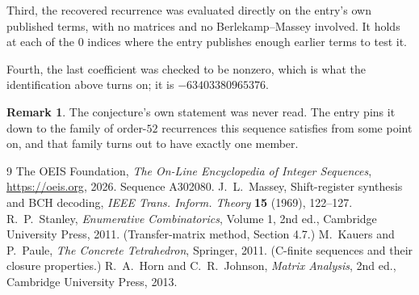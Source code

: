 \documentclass[11pt,a4paper]{article}
\theoremstyle{plain}
\theoremstyle{definition}
\newtheorem{remark}[theorem]{Remark}
\begin{document}
Third, the recovered recurrence was evaluated directly on the entry's own published terms, with
no matrices and no Berlekamp--Massey involved. It holds at each of the $0$ indices where
the entry publishes enough earlier terms to test it.

Fourth, the last coefficient was checked to be nonzero, which is what the identification above
turns on; it is $-63403380965376$.

\begin{remark}
The conjecture's own statement was never read. The entry pins it down to the family of
order-$52$ recurrences this sequence satisfies from some point on, and that family turns
out to have exactly one member.
\end{remark}

\begin{thebibliography}{9}
 The OEIS Foundation, \emph{The On-Line Encyclopedia of Integer
Sequences}, \url{https://oeis.org}, 2026. Sequence A302080.
 J.~L.~Massey, Shift-register synthesis and BCH decoding, \emph{IEEE
Trans. Inform. Theory} \textbf{15} (1969), 122--127.
 R.~P.~Stanley, \emph{Enumerative Combinatorics}, Volume 1, 2nd ed.,
Cambridge University Press, 2011. (Transfer-matrix method, Section 4.7.)
 M.~Kauers and P.~Paule, \emph{The Concrete Tetrahedron}, Springer, 2011.
(C-finite sequences and their closure properties.)
 R.~A.~Horn and C.~R.~Johnson, \emph{Matrix Analysis}, 2nd ed., Cambridge
University Press, 2013.
\end{thebibliography}
\end{document}
